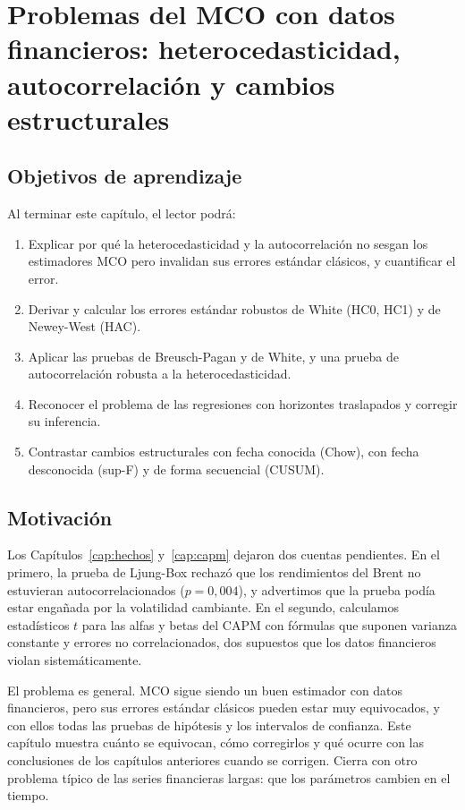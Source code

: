 \chapter[Problemas del MCO con datos financieros]{Problemas del MCO con datos financieros: heterocedasticidad, autocorrelación y cambios estructurales}\label{cap:robustos}

\section*{Objetivos de aprendizaje}
Al terminar este capítulo, el lector podrá:
\begin{enumerate}[label=\arabic*.,leftmargin=*]
  \item Explicar por qué la heterocedasticidad y la autocorrelación no sesgan los estimadores MCO pero
        invalidan sus errores estándar clásicos, y cuantificar el error.
  \item Derivar y calcular los errores estándar robustos de White (HC0, HC1) y de Newey-West (HAC).
  \item Aplicar las pruebas de Breusch-Pagan y de White, y una prueba de autocorrelación robusta a la
        heterocedasticidad.
  \item Reconocer el problema de las regresiones con horizontes traslapados y corregir su inferencia.
  \item Contrastar cambios estructurales con fecha conocida (Chow), con fecha desconocida (sup-F) y de
        forma secuencial (CUSUM).
\end{enumerate}

\section*{Motivación}
Los Capítulos~\ref{cap:hechos} y~\ref{cap:capm} dejaron dos cuentas pendientes. En el primero, la prueba de
Ljung-Box rechazó que los rendimientos del Brent no estuvieran autocorrelacionados ($p=0{,}004$), y
advertimos que la prueba podía estar engañada por la volatilidad cambiante. En el segundo, calculamos
estadísticos $t$ para las alfas y betas del CAPM con fórmulas que suponen varianza constante y errores no
correlacionados, dos supuestos que los datos financieros violan sistemáticamente.

El problema es general. MCO sigue siendo un buen estimador con datos financieros, pero sus errores estándar
clásicos pueden estar muy equivocados, y con ellos todas las pruebas de hipótesis y los intervalos de
confianza. Este capítulo muestra cuánto se equivocan, cómo corregirlos y qué ocurre con las conclusiones de
los capítulos anteriores cuando se corrigen. Cierra con otro problema típico de las series financieras
largas: que los parámetros cambien en el tiempo.


